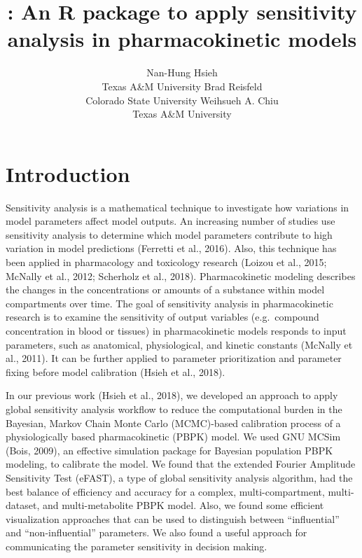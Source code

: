 \documentclass[article]{jss}
\author{
Nan-Hung Hsieh\\Texas A\&M University \And Brad Reisfeld\\Colorado State University \And Weihsueh A. Chiu\\Texas A\&M University
}
\title{\pkg{pksensi}: An R package to apply sensitivity analysis in
pharmacokinetic models}
\begin{document}
\hypertarget{introduction}{%
\section{Introduction}\label{introduction}}

Sensitivity analysis is a mathematical technique to investigate how
variations in model parameters affect model outputs. An increasing
number of studies use sensitivity analysis to determine which model
parameters contribute to high variation in model predictions (Ferretti
et al., 2016). Also, this technique has been applied in pharmacology and
toxicology research (Loizou et al., 2015; McNally et al., 2012;
Scherholz et al., 2018). Pharmacokinetic modeling describes the changes
in the concentrations or amounts of a substance within model
compartments over time. The goal of sensitivity analysis in
pharmacokinetic research is to examine the sensitivity of output
variables (e.g.~compound concentration in blood or tissues) in
pharmacokinetic models responds to input parameters, such as anatomical,
physiological, and kinetic constants (McNally et al., 2011). It can be
further applied to parameter prioritization and parameter fixing before
model calibration (Hsieh et al., 2018).

In our previous work (Hsieh et al., 2018), we developed an approach to
apply global sensitivity analysis workflow to reduce the computational
burden in the Bayesian, Markov Chain Monte Carlo (MCMC)-based
calibration process of a physiologically based pharmacokinetic (PBPK)
model. We used GNU MCSim (Bois, 2009), an effective simulation package
for Bayesian population PBPK modeling, to calibrate the model. We found
that the extended Fourier Amplitude Sensitivity Test (eFAST), a type of
global sensitivity analysis algorithm, had the best balance of
efficiency and accuracy for a complex, multi-compartment, multi-dataset,
and multi-metabolite PBPK model. Also, we found some efficient
visualization approaches that can be used to distinguish between
``influential'' and ``non-influential'' parameters. We also found a
useful approach for communicating the parameter sensitivity in decision
making.
\end{document}
